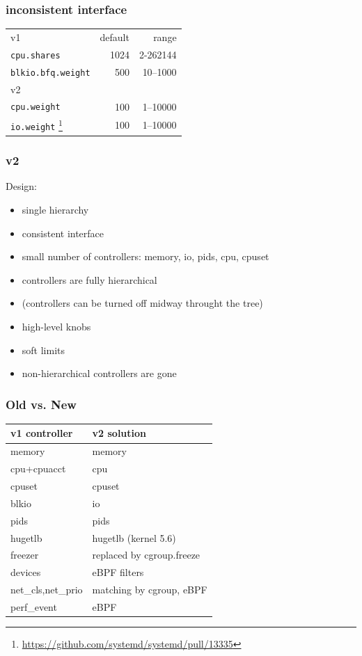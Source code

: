 \documentclass[serif]{beamer}
\begin{document}
\begin{frame}[fragile]
  \frametitle{inconsistent interface}

  \begin{tabular}{l|rr}
    v1                        & default & range           \\
    \texttt{cpu.shares}       & 1024 & 2-262144 \\
    \texttt{blkio.bfq.weight} & 500  & 10–1000 \\
    \hline
    v2           \\
    \texttt{cpu.weight}       & 100  & 1–10000 \\
    \texttt{io.weight}%
    \footnote{\textcolor{gray}{\url{https://github.com/systemd/systemd/pull/13335}}}
    & 100  & 1–10000
  \end{tabular}
\end{frame}

\begin{frame}
  \frametitle{v2}

  Design:
  \begin{itemize}
  \item single hierarchy
  \item consistent interface
  \item small number of controllers: memory, io, pids, cpu, cpuset
  \item controllers are fully hierarchical
  \item (controllers can be turned off midway throught the tree)
  \item high-level knobs
  \item soft limits
  \item non-hierarchical controllers are gone
  \end{itemize}
\end{frame}

\begin{frame}[fragile]
  \frametitle{Old vs. New}

  \begin{tabular}{l|l}
    v1 controller          &  v2 solution\\
    \hline
    memory                 &  memory \\
    cpu+cpuacct            &  cpu    \\
    cpuset                 &  cpuset \\
    blkio                  &  io     \\
    pids                   &  pids   \\
    hugetlb                &  hugetlb (kernel 5.6)\\[1em]\pause

    freezer                &  replaced by cgroup.freeze\\[1em]\pause
    devices                &  eBPF filters \\[1em]\pause
    net\_cls,net\_prio     &  matching by cgroup, eBPF\\
    perf\_event            &  eBPF
  \end{tabular}
\end{frame}
\end{document}
